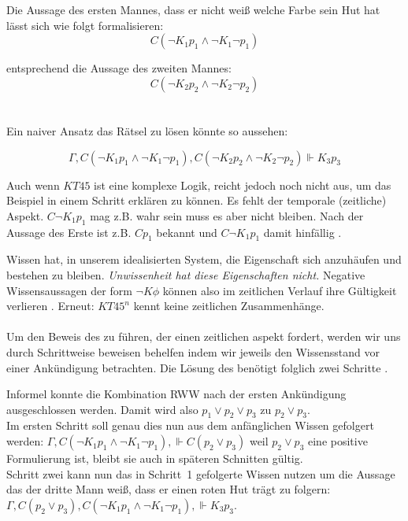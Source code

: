 \newline

Die Aussage des ersten Mannes, dass er nicht weiß welche Farbe sein Hut hat lässt sich wie folgt formalisieren:
\begin{equation*}
	C(\neg K_1 p_1 \wedge \neg K_1 \neg p_1)
\end{equation*}

entsprechend die Aussage des zweiten Mannes:
\begin{equation*}
	C(\neg K_2 p_2 \wedge \neg K_2 \neg p_2)
\end{equation*}
\\\\

Ein naiver Ansatz das Rätsel zu lösen könnte so aussehen:

\begin{equation}
	\Gamma, C(\neg K_1 p_1 \wedge \neg K_1 \neg p_1), C(\neg K_2 p_2 \wedge \neg K_2 \neg p_2) \Vdash K_3 p_3
\end{equation}

Auch wenn $KT45$ ist eine komplexe Logik, reicht jedoch noch nicht aus, um das Beispiel in einem Schritt erklären zu können.
Es fehlt der temporale (zeitliche) Aspekt.
$C \neg K_1 p_1$ mag z.B. wahr sein muss es aber nicht bleiben.
Nach der Aussage des Erste ist z.B. $C p_1$ bekannt und $C \neg K_1 p_1$ damit hinfällig .

Wissen hat, in unserem idealisierten System, die Eigenschaft sich anzuhäufen und bestehen zu bleiben. 
\emph{Unwissenheit hat diese Eigenschaften nicht.}
Negative Wissensaussagen der form $\neg K \phi$ können also im zeitlichen Verlauf ihre Gültigkeit verlieren .
Erneut: $KT45^n$ kennt keine zeitlichen Zusammenhänge.\\\\

Um den Beweis des \WMRs zu führen, der einen zeitlichen aspekt fordert, werden wir uns durch Schrittweise beweisen behelfen indem wir jeweils den Wissensstand vor einer Ankündigung betrachten.
Die Lösung des \WMRs benötigt folglich zwei Schritte .

Informel konnte die Kombination RWW nach der ersten Ankündigung ausgeschlossen werden.
Damit wird also $p_1 \vee p_2 \vee p_3$ zu $p_2 \vee p_3$.\\
Im ersten Schritt soll genau dies nun aus dem anfänglichen Wissen gefolgert werden:
$\Gamma, C(\neg K_1 p_1 \wedge \neg K_1 \neg p_1), \Vdash C(p_2 \vee p_3)$
weil $p_2 \vee p_3$ eine positive Formulierung ist, bleibt sie auch in späteren Schnitten gültig.\\
Schritt zwei kann nun das in Schritt~1 gefolgerte Wissen nutzen um die Aussage das der dritte Mann weiß, dass er einen roten Hut trägt zu folgern:
$\Gamma, C(p_2 \vee p_3), C(\neg K_1 p_1 \wedge \neg K_1 \neg p_1), \Vdash K_3 p_3$.\\\\

